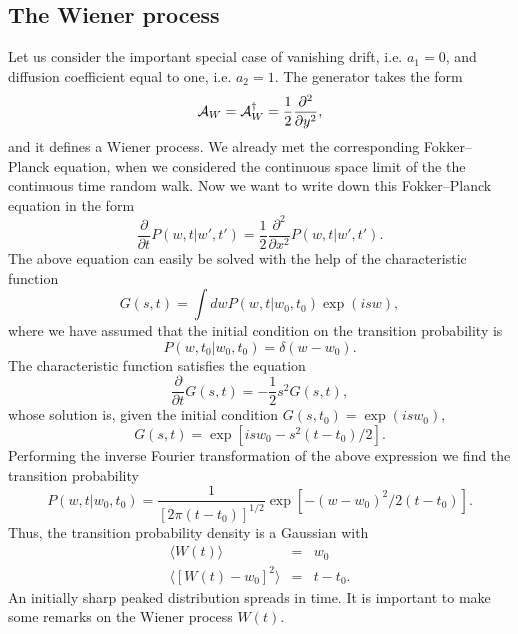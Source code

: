 \subsection{The Wiener process}
Let us consider the important special case 
of vanishing drift, i.e. $a_1=0$, and diffusion coefficient
equal to one, i.e. $a_2=1$. The generator takes the form 
\begin{equation}
\label{WIENER_GENERATOR}
{\cal{A}}_W = {\cal{A}}_W^{\dagger} = \frac{1}{2} 
     \frac{\partial^2}{\partial y^2},
\end{equation}
and it defines a Wiener process. We already met the corresponding
Fokker--Planck equation, 
when we considered the continuous space limit of the the 
continuous time random walk.
Now we want to write down this Fokker--Planck equation in the form
\begin{equation*}
\frac{\partial}{\partial t}P(w,t|w',t') =
  \frac{1}{2} \frac{\partial^2}{\partial x^2} P(w,t|w',t').
\end{equation*}
The above equation can easily be solved with the help of the 
characteristic function
\begin{equation*}
G(s,t) = \int dw P(w,t|w_0,t_0) \exp(isw),
\end{equation*}
where we have assumed that the initial condition on the transition 
probability is
\begin{equation*}
P(w,t_0|w_0,t_0) = \delta(w-w_0).
\end{equation*}
The characteristic function satisfies the equation
\begin{equation*}
\frac{\partial}{\partial t}G(s,t) = - \frac{1}{2} s^2 G(s,t),
\end{equation*}
whose solution is, given the initial condition $G(s,t_0)=\exp(isw_0)$, 
\begin{equation*}
G(s,t) = \exp\left[isw_0 -s^2(t-t_0)/2\right].
\end{equation*}
Performing the inverse Fourier transformation of the above 
expression we find the transition probability
\begin{equation}
\label{TRANS_WIENER}
P(w,t|w_0,t_0)= \frac{1}{[2 \pi (t-t_0)]^{1/2}}
     \exp\left[ -(w-w_0)^2/2(t-t_0)\right].
\end{equation}
Thus, the transition probability density is a Gaussian with
\begin{eqnarray*}
\langle W(t) \rangle &=& w_0 \\
\langle [W(t)-w_0]^2\rangle &=& t-t_0.
\end{eqnarray*}
An initially sharp peaked distribution spreads in time.
It is important to make some remarks on the Wiener process $W(t)$.

